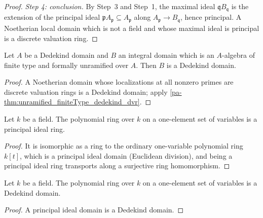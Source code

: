 \begin{proof}
  \emph{Step 4: conclusion.} By Step~3 and Step~1, the maximal ideal
  \(\mathfrak q B_{\mathfrak q}\) is the extension of the principal ideal
  \(\mathfrak p A_{\mathfrak p} \subseteq A_{\mathfrak p}\) along
  \(A_{\mathfrak p} \to B_{\mathfrak q}\), hence principal. A Noetherian local domain which
  is not a field and whose maximal ideal is principal is a discrete valuation ring.
\end{proof}

\begin{corollary}
  \label{pa-cor:unramified_finiteType_dedekind}
  \leanok

  Let \(A\) be a Dedekind domain and \(B\) an integral domain which is an \(A\)-algebra of
  finite type and formally unramified over \(A\). Then \(B\) is a Dedekind domain.
\end{corollary}
\begin{proof}
  \leanok
  A Noetherian domain whose localizations at all nonzero primes are discrete valuation
  rings is a Dedekind domain; apply \ref{pa-thm:unramified_finiteType_dedekind_dvr}.
\end{proof}

\begin{lemma}
  \label{pa-lem:mvpoly_fin_one_pid}
  \leanok

  Let \(k\) be a field. The polynomial ring over \(k\) on a one-element set of variables is
  a principal ideal ring.
\end{lemma}
\begin{proof}
  \leanok
  It is isomorphic as a ring to the ordinary one-variable polynomial ring \(k[t]\), which
  is a principal ideal domain (Euclidean division), and being a principal ideal ring
  transports along a surjective ring homomorphism.
\end{proof}

\begin{lemma}
  \label{pa-lem:mvpoly_fin_one_dedekind}
  \leanok

  Let \(k\) be a field. The polynomial ring over \(k\) on a one-element set of variables is
  a Dedekind domain.
\end{lemma}
\begin{proof}
  \leanok
  A principal ideal domain is a Dedekind domain.
\end{proof}

